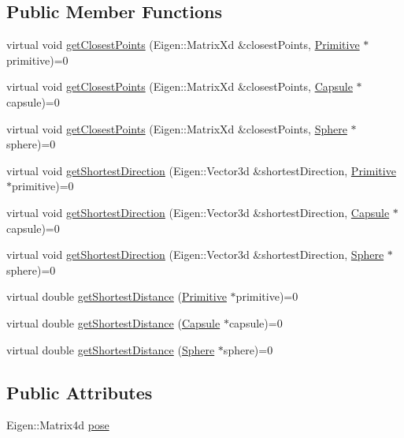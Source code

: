 \subsection*{Public Member Functions}
\begin{DoxyCompactItemize}
\item 
virtual void \hyperlink{class_primitive_ae838e4e129f05642994da59f08f85f56}{get\+Closest\+Points} (Eigen\+::\+Matrix\+Xd \&closest\+Points, \hyperlink{class_primitive}{Primitive} $\ast$primitive)=0
\item 
virtual void \hyperlink{class_primitive_a2b8b8dea111d9eda31f72e06b47e9aa9}{get\+Closest\+Points} (Eigen\+::\+Matrix\+Xd \&closest\+Points, \hyperlink{class_capsule}{Capsule} $\ast$capsule)=0
\item 
virtual void \hyperlink{class_primitive_ac86ef47d59c21448ce78c91490c7dbd4}{get\+Closest\+Points} (Eigen\+::\+Matrix\+Xd \&closest\+Points, \hyperlink{class_sphere}{Sphere} $\ast$sphere)=0
\item 
virtual void \hyperlink{class_primitive_ae37bbdf5271bf278b19888e0428579a8}{get\+Shortest\+Direction} (Eigen\+::\+Vector3d \&shortest\+Direction, \hyperlink{class_primitive}{Primitive} $\ast$primitive)=0
\item 
virtual void \hyperlink{class_primitive_af9bd724a6618bd76e41e5682caa25023}{get\+Shortest\+Direction} (Eigen\+::\+Vector3d \&shortest\+Direction, \hyperlink{class_capsule}{Capsule} $\ast$capsule)=0
\item 
virtual void \hyperlink{class_primitive_a3f1bc91de29fa904657c1ba4c40eee53}{get\+Shortest\+Direction} (Eigen\+::\+Vector3d \&shortest\+Direction, \hyperlink{class_sphere}{Sphere} $\ast$sphere)=0
\item 
virtual double \hyperlink{class_primitive_a340b3e5540b910480ada939383985d66}{get\+Shortest\+Distance} (\hyperlink{class_primitive}{Primitive} $\ast$primitive)=0
\item 
virtual double \hyperlink{class_primitive_a46e60acfe4c005c0ec94e1e8b82d36db}{get\+Shortest\+Distance} (\hyperlink{class_capsule}{Capsule} $\ast$capsule)=0
\item 
virtual double \hyperlink{class_primitive_adaac4fc4fedf9cd76d4eb9c77e9ae560}{get\+Shortest\+Distance} (\hyperlink{class_sphere}{Sphere} $\ast$sphere)=0
\end{DoxyCompactItemize}
\subsection*{Public Attributes}
\begin{DoxyCompactItemize}
\item 
Eigen\+::\+Matrix4d \hyperlink{class_primitive_ad8b2afbad412f6046783d155c88fe312}{pose}
\end{DoxyCompactItemize}


